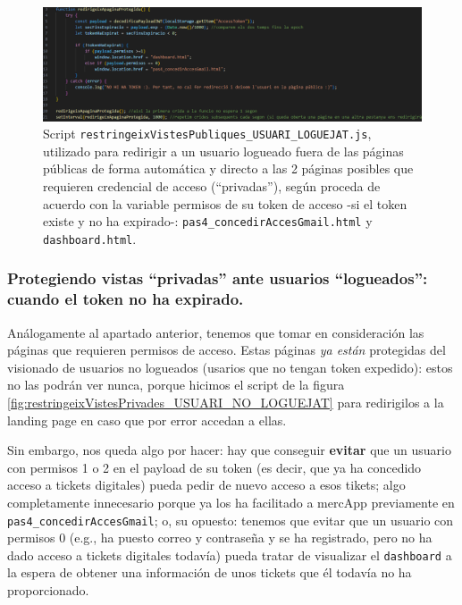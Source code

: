 \documentclass[a4paper,12pt]{report}
\begin{document}
\setlength{\abovecaptionskip}{15pt}
\FloatBarrier
\begin{figure}[H]
	\centering
	\caption{Script \texttt{restringeixVistesPubliques\_USUARI\_LOGUEJAT.js}, utilizado para redirigir a un usuario logueado fuera de las páginas públicas de forma automática y directo a las 2 páginas posibles que requieren credencial de acceso (``privadas''), según proceda de acuerdo con la variable permisos de su token de acceso -si el token existe y no ha expirado-: \texttt{pas4\_concedirAccesGmail.html} y \texttt{dashboard.html}.}
	\includegraphics[width=1\linewidth]{img/restringeixVistesPubliques_USUARI_LOGUEJAT.png}
	
	\label{fig:restringeixVistesPubliquesUSUARILOGUEJAT}
\end{figure}
\FloatBarrier	
	


	
\subsubsection{Protegiendo vistas ``privadas'' ante usuarios ``logueados'': cuando el token no ha expirado.}
\label{sec:vistasPermisos}

Análogamente al apartado anterior, tenemos que tomar en consideración las páginas que requieren permisos de acceso. Estas páginas \textit{ya están} protegidas del visionado de usuarios no logueados (usarios que no tengan token expedido): estos no las podrán ver nunca, porque hicimos el script de la figura \ref{fig:restringeixVistesPrivades_USUARI_NO_LOGUEJAT} para redirigilos a la landing page en caso que por error accedan a ellas.

Sin embargo, nos queda algo por hacer: hay que conseguir \textbf{evitar} que un usuario con permisos 1 o 2 en el payload de su token (es decir, que ya ha concedido acceso a tickets digitales) pueda pedir de nuevo acceso a esos tikets; algo completamente innecesario porque ya los ha facilitado a mercApp previamente en \texttt{pas4\_concedirAccesGmail}; o, su opuesto: tenemos que evitar que un usuario con permisos 0 (e.g., ha puesto correo y contraseña y se ha registrado, pero no ha dado acceso a tickets digitales todavía) pueda tratar de visualizar el \texttt{dashboard} a la espera de obtener una información de unos tickets que él todavía no ha proporcionado.
\end{document}
